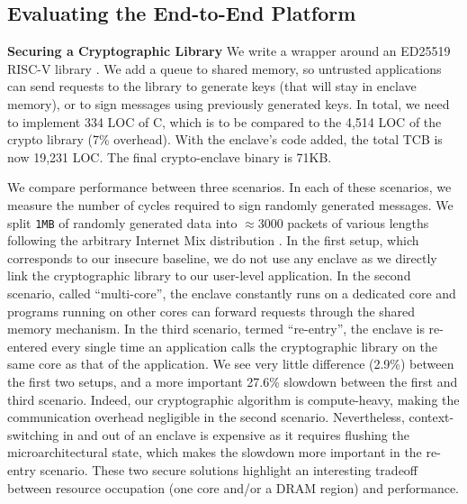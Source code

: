\subsection{Evaluating the End-to-End Platform}

\noindent\textbf{Securing a Cryptographic Library}
\label{sec:evalcrypto}
We write a wrapper around an ED25519 RISC-V library \cite{ed25519github}.
We add a queue to shared memory, so untrusted applications can send requests to the library to generate keys (that will stay in enclave memory), or to sign messages using previously generated keys.
In total, we need to implement 334 LOC of C, which is to be compared to the 4,514 LOC of the crypto library (7\% overhead).
With the enclave's code added, the total TCB is now 19,231 LOC.
The final crypto-enclave binary is 71KB.

We compare performance between three scenarios.
In each of these scenarios, we measure the number of cycles required to sign randomly generated messages.
We split \texttt{1MB} of randomly generated data into $\approx 3000$ packets of various lengths following the arbitrary Internet Mix distribution \cite{imix}.
In the first setup, which corresponds to our insecure baseline, we do not use any enclave as we directly link the cryptographic library to our user-level application.
In the second scenario, called ``multi-core'', the enclave constantly runs on a dedicated core and programs running on other cores can forward requests through the shared memory mechanism.
In the third scenario, termed ``re-entry'', the enclave is re-entered every single time an application calls the cryptographic library on the same core as that of the application.
We see very little difference (2.9\%) between the first two setups, and a more important 27.6\% slowdown between the first and third scenario.
Indeed, our cryptographic algorithm is compute-heavy, making the communication overhead negligible in the second scenario.
Nevertheless, context-switching in and out of an enclave is expensive as it requires flushing the microarchitectural state, which makes the slowdown more important in the re-entry scenario.
These two secure solutions highlight an interesting tradeoff between resource occupation (one core and/or a DRAM region) and performance.

